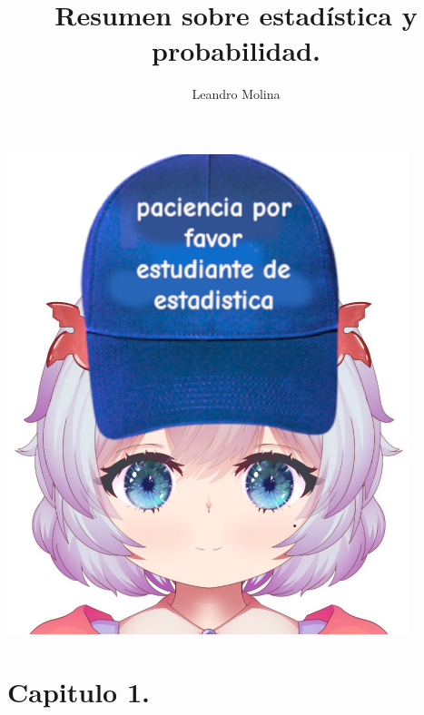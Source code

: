 \documentclass[]{article}
\title{Resumen sobre estadística y probabilidad.}
\author{Leandro Molina}
\begin{document}
\maketitle
\vspace{-20pt}

\noindent
\includegraphics[width=\linewidth, height=14cm]{twin_estadistica.png}
\pagebreak

\tableofcontents

\pagebreak
\section{Capitulo 1.}
\end{document}
